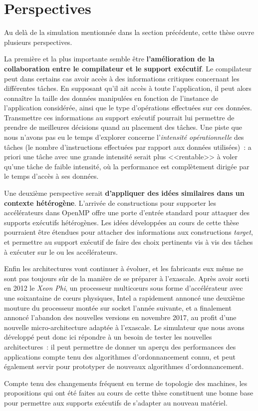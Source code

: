 \section*{Perspectives}

Au delà de la simulation mentionnée dans la section précédente, cette thèse ouvre plusieurs perspectives.

La première et la plus importante semble être \textbf{l'amélioration de la collaboration entre le compilateur et le support exécutif}.
Le compilateur peut dans certains cas avoir accès à des informations critiques concernant les différentes tâches.
En supposant qu'il ait accès à toute l'application, il peut alors connaître la taille des données manipulées en fonction de l'instance de l'application considérée, ainsi que le type d'opérations effectuées sur ces données.
Transmettre ces informations au support exécutif pourrait lui permettre de prendre de meilleures décisions quand au placement des tâches.
Une piste que nous n'avons pas eu le temps d'explorer concerne l'\emph{intensité opérationnelle} des tâches (le nombre d'instructions effectuées par rapport aux données utilisées)~: a priori une tâche avec une grande intensité serait plus <<rentable>> à voler qu'une tâche de faible intensité, où la performance est complètement dirigée par le temps d'accès à ses données.

Une deuxième perspective serait \textbf{d'appliquer des idées similaires dans un contexte hétérogène}.
L'arrivée de constructions pour supporter les accélérateurs dans OpenMP offre une porte d'entrée standard pour attaquer des supports exécutifs hétérogènes.
Les idées développées au cours de cette thèse pourraient être étendues pour attacher des informations aux constructions \emph{target}, et permettre au support exécutif de faire des choix pertinents vis à vis des tâches à exécuter sur le ou les accélérateurs.

Enfin les architectures vont continuer à évoluer, et les fabricants eux même ne sont pas toujours sûr de la manière de se préparer à l'exascale.
Après avoir sorti en 2012 le \emph{Xeon Phi}, un processeur multicœurs sous forme d'accélérateur avec une soixantaine de cœurs physiques, Intel a rapidement annoncé une deuxième mouture du processeur montée sur socket l'année suivante, et a finalement annoncé l'abandon des nouvelles versions en novembre 2017, au profit d'une nouvelle micro-architecture adaptée à l'exascale.
Le simulateur que nous avons développé peut donc ici répondre à un besoin de tester les nouvelles architectures~: il peut permettre de donner un aperçu des performances des applications compte tenu des algorithmes d'ordonnancement connu, et peut également servir pour prototyper de nouveaux algorithmes d'ordonnancement.

Compte tenu des changements fréquent en terme de topologie des machines, les propositions qui ont été faites au cours de cette thèse constituent une bonne base pour permettre aux supports exécutifs de s'adapter au nouveau matériel.
